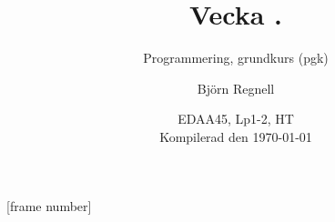 [frame number]



\title[Föreläsning i ''Programmering, grundkurs'', Björn Regnell, senast uppdaterad: \today]{Vecka \vecka. \veckotema}
\subtitle{Programmering, grundkurs (pgk)}
\author{Björn Regnell}
\date{EDAA45, Lp1-2, HT\CurrentYear\\{\vspace{1em}\tiny Kompilerad den \today}}


